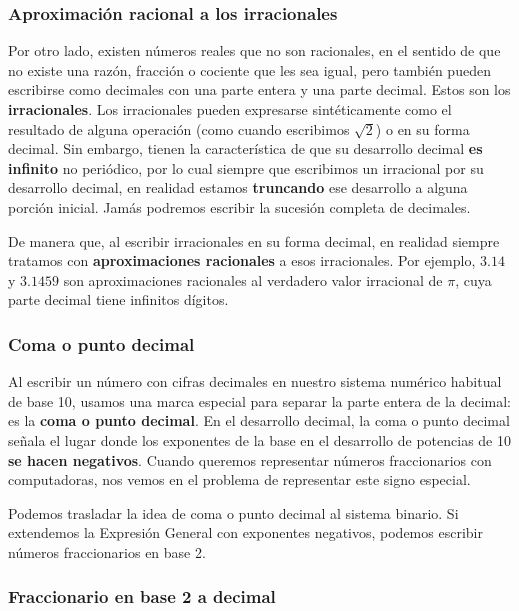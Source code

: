 \documentclass[spanish,A4,]{article}
\begin{document}
\subsubsection{Aproximación racional a los
irracionales}\label{aproximaciuxf3n-racional-a-los-irracionales}

Por otro lado, existen números reales que no son racionales, en el
sentido de que no existe una razón, fracción o cociente que les sea
igual, pero también pueden escribirse como decimales con una parte
entera y una parte decimal. Estos son los \textbf{irracionales}. Los
irracionales pueden expresarse sintéticamente como el resultado de
alguna operación (como cuando escribimos $\sqrt 2$) o en su forma
decimal. Sin embargo, tienen la característica de que su desarrollo
decimal \textbf{es infinito} no periódico, por lo cual siempre que
escribimos un irracional por su desarrollo decimal, en realidad estamos
\textbf{truncando} ese desarrollo a alguna porción inicial. Jamás
podremos escribir la sucesión completa de decimales.

De manera que, al escribir irracionales en su forma decimal, en realidad
siempre tratamos con \textbf{aproximaciones racionales} a esos
irracionales. Por ejemplo, $3.14$ y $3.1459$ son aproximaciones
racionales al verdadero valor irracional de $\pi$, cuya parte decimal
tiene infinitos dígitos.

\subsubsection{Coma o punto decimal}\label{coma-o-punto-decimal}

Al escribir un número con cifras decimales en nuestro sistema numérico
habitual de base 10, usamos una marca especial para separar la parte
entera de la decimal: es la \textbf{coma o punto decimal}. En el
desarrollo decimal, la coma o punto decimal señala el lugar donde los
exponentes de la base en el desarrollo de potencias de 10 \textbf{se
hacen negativos}. Cuando queremos representar números fraccionarios con
computadoras, nos vemos en el problema de representar este signo
especial.

Podemos trasladar la idea de coma o punto decimal al sistema binario. Si
extendemos la Expresión General con exponentes negativos, podemos
escribir números fraccionarios en base 2.

\subsubsection{Fraccionario en base 2 a
decimal}\label{fraccionario-en-base-2-a-decimal}
\end{document}
